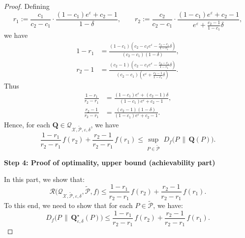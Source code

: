 \documentclass[accepted]{article}
\theoremstyle{plain} %
\theoremstyle{definition}
\theoremstyle{remark}
\newcommand{\bQ}{\mathbf{Q}}
\begin{document}
\begin{proof}
Defining
\[
    r_1 := \frac{c_1}{c_2 - c_1} \cdot \frac{(1 - c_1)e^{\varepsilon} + c_2 - 1}{1 - \delta},
    \qquad
    r_2 := \frac{c_2}{c_2 - c_1} \cdot \frac{(1 - c_1)e^{\varepsilon} + c_2 - 1}{e^{\varepsilon} + \frac{c_2 - 1}{1 - c_1} \delta},
    \]
 we have   
\begin{align*}
1 - r_1 &= \frac{(1-c_1)\left(c_2 - c_1 e^\varepsilon - \frac{c_2-c_1}{1-c_1}\delta\right)}{(c_2-c_1)(1-\delta)}, \\
r_2 - 1 &= \frac{(c_2-1)\left(c_2 - c_1 e^\varepsilon - \frac{c_2-c_1}{1-c_1}\delta\right)}{(c_2-c_1)\left(e^\varepsilon + \frac{c_2-1}{1-c_1}\delta\right)}.
\end{align*}
Thus
\begin{align*}
\frac{1 - r_1}{r_2 - r_1} &= \frac{(1-c_1)e^\varepsilon + (c_2-1)\delta}{(1-c_1)e^\varepsilon + c_2-1}, \\
\frac{r_2 - 1}{r_2 - r_1} &= \frac{(c_2-1)(1-\delta)}{(1-c_1)e^\varepsilon + c_2-1}.
\end{align*}
Hence, for each $\bQ \in \mathcal{Q}_{\mathcal{X}, \tilde{\mathcal{P}}, \varepsilon, \delta}$, we have
     \[\frac{1 - r_1}{r_2 - r_1} \, f(r_2) + \frac{r_2 - 1}{r_2 - r_1} \, f(r_1) \le \sup_{P \in \tilde{\mathcal{P}}} 
        \;D_f\big(P \, \| \, \bQ(P)\big).\]
        
    \textbf{Step 4: Proof of optimality, upper bound (achievability part)}

    In this part, we show that:
    \[\mathcal{R}\big(\mathcal{Q}_{\mathcal{X}, \tilde{\mathcal{P}}, \varepsilon, \delta}, \tilde{\mathcal{P}}, f\big)
       \le \frac{1 - r_1}{r_2 - r_1} \, f(r_2) + \frac{r_2 - 1}{r_2 - r_1} \, f(r_1).\]
        To this end, we need to show that for each $P \in  \tilde{\mathcal{P}}$, we have:
        \[D_f\big(P \, \| \, \bQ^\star_{\varepsilon, \delta}(P)\big) \le \frac{1 - r_1}{r_2 - r_1} \, f(r_2) + \frac{r_2 - 1}{r_2 - r_1} \, f(r_1).\]


\end{proof}
\end{document}
